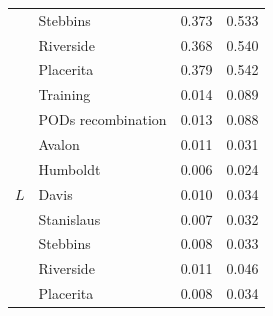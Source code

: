 \documentclass[a4paper, 12pt]{article}
\begin{document}
\begin{table}[ht]
\begin{tabular}{clll}
                                                           & Stebbins           & 0.373 & 0.533\\
                                                           & Riverside          & 0.368 & 0.540\\
                                                           & Placerita          & 0.379 & 0.542\\ 
\hline
\multirow{9}{*}{$L$}                            & Training           & 0.014  & 0.089 \\
                                                           & PODs recombination & 0.013 & 0.088 \\
                                                           & Avalon             & 0.011 & 0.031 \\
                                                           & Humboldt        & 0.006 & 0.024\\
                                                           & Davis              & 0.010 & 0.034\\
                                                           & Stanislaus       & 0.007 & 0.032\\
                                                           & Stebbins          & 0.008 & 0.033 \\
                                                           & Riverside         & 0.011 & 0.046\\
                                                           & Placerita          & 0.008 & 0.034\\ 
\hline
\end{tabular}
\label{tab:supple_neutral_mse}
\end{table}

\newpage
\end{document}
